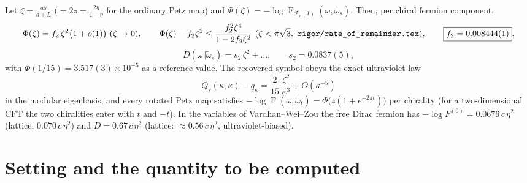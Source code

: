 \documentclass[11pt]{article}
\theoremstyle{accent}
\theoremstyle{definition}
\newcommand{\cF}{\mathcal{F}}
\newcommand{\Fid}{\operatorname{F}}
\begin{document}
\begin{mainbox}
Let \(\zeta=\frac{as}{a+L}\) (\(=2z=\frac{2\eta}{1-\eta}\) for the ordinary Petz map) and \(\Phi(\zeta)=-\log\Fid_{\cF_r(I)}(\omega,\widetilde\omega_s)\).  Then, per chiral fermion component,
\[
 \Phi(\zeta)=f_2\,\zeta^2\bigl(1+o(1)\bigr)\ (\zeta\to0),\qquad \Phi(\zeta)-f_2\zeta^2\le\frac{f_2^2\zeta^4}{1-2f_2\zeta^2}\ (\zeta<\pi\sqrt3,\ \text{\texttt{rigor/rate\_of\_remainder.tex}}),\qquad
 \boxed{f_2=0.008444(1)},
\]
\[
 D(\omega\Vert\widetilde\omega_s)=s_2\,\zeta^2+\dots,\qquad \boxed{s_2=0.0837(5)},
\]
with \(\Phi(1/15)=3.517(3)\times10^{-5}\) as a reference value.  The recovered symbol obeys the exact ultraviolet law
\[
 \boxed{\;\widetilde Q_s(\kappa,\kappa)-q_\kappa=\frac{2}{15}\,\frac{\zeta^2}{\kappa^3}+O(\kappa^{-5})\;}
\]
in the modular eigenbasis, and every rotated Petz map satisfies \(-\log\Fid(\omega,\widetilde\omega_t)=\Phi\bigl(z(1+e^{-2\pi t})\bigr)\) per chirality (for a two-dimensional CFT the two chiralities enter with \(t\) and \(-t\)).  In the variables of Vardhan--Wei--Zou the free Dirac fermion has \(-\log F^{(0)}=0.0676\,c\,\eta^2\) (lattice: \(0.070\,c\,\eta^2\)) and \(D=0.67\,c\,\eta^2\) (lattice: \(\approx0.56\,c\,\eta^2\), ultraviolet-biased).
\end{mainbox}


\tableofcontents
\clearpage

\section{Setting and the quantity to be computed}\label{sec:setting}
\end{document}
